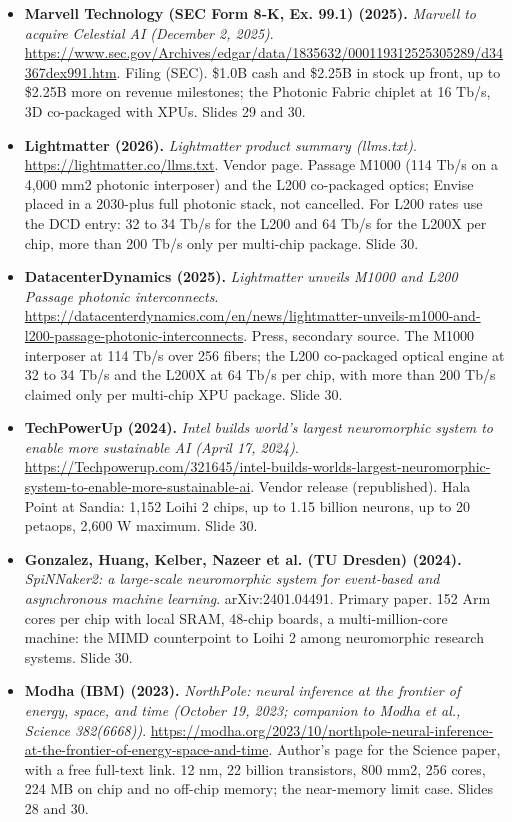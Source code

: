 \begin{itemize}[leftmargin=1.2em,itemsep=3pt]
\item \textbf{Marvell Technology (SEC Form 8-K, Ex. 99.1) (2025).} \textit{Marvell to acquire Celestial AI (December 2, 2025)}. \url{https://www.sec.gov/Archives/edgar/data/1835632/000119312525305289/d34367dex991.htm}. Filing (SEC). \$1.0B cash and \$2.25B in stock up front, up to \$2.25B more on revenue milestones; the Photonic Fabric chiplet at 16 Tb/s, 3D co-packaged with XPUs. Slides 29 and 30.
\item \textbf{Lightmatter (2026).} \textit{Lightmatter product summary (llms.txt)}. \url{https://lightmatter.co/llms.txt}. Vendor page. Passage M1000 (114 Tb/s on a 4,000 mm2 photonic interposer) and the L200 co-packaged optics; Envise placed in a 2030-plus full photonic stack, not cancelled. For L200 rates use the DCD entry: 32 to 34 Tb/s for the L200 and 64 Tb/s for the L200X per chip, more than 200 Tb/s only per multi-chip package. Slide 30.
\item \textbf{DatacenterDynamics (2025).} \textit{Lightmatter unveils M1000 and L200 Passage photonic interconnects}. \url{https://datacenterdynamics.com/en/news/lightmatter-unveils-m1000-and-l200-passage-photonic-interconnects}. Press, secondary source. The M1000 interposer at 114 Tb/s over 256 fibers; the L200 co-packaged optical engine at 32 to 34 Tb/s and the L200X at 64 Tb/s per chip, with more than 200 Tb/s claimed only per multi-chip XPU package. Slide 30.
\item \textbf{TechPowerUp (2024).} \textit{Intel builds world's largest neuromorphic system to enable more sustainable AI (April 17, 2024)}. \url{https://Techpowerup.com/321645/intel-builds-worlds-largest-neuromorphic-system-to-enable-more-sustainable-ai}. Vendor release (republished). Hala Point at Sandia: 1,152 Loihi 2 chips, up to 1.15 billion neurons, up to 20 petaops, 2,600 W maximum. Slide 30.
\item \textbf{Gonzalez, Huang, Kelber, Nazeer et al. (TU Dresden) (2024).} \textit{SpiNNaker2: a large-scale neuromorphic system for event-based and asynchronous machine learning}. arXiv:2401.04491. Primary paper. 152 Arm cores per chip with local SRAM, 48-chip boards, a multi-million-core machine: the MIMD counterpoint to Loihi 2 among neuromorphic research systems. Slide 30.
\item \textbf{Modha (IBM) (2023).} \textit{NorthPole: neural inference at the frontier of energy, space, and time (October 19, 2023; companion to Modha et al., Science 382(6668))}. \url{https://modha.org/2023/10/northpole-neural-inference-at-the-frontier-of-energy-space-and-time}. Author's page for the Science paper, with a free full-text link. 12 nm, 22 billion transistors, 800 mm2, 256 cores, 224 MB on chip and no off-chip memory; the near-memory limit case. Slides 28 and 30.

\end{itemize}
